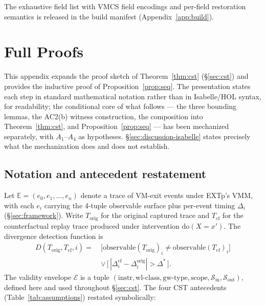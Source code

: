 \documentclass[conference]{IEEEtran}
\newcommand{\Korig}{T_\text{orig}}
\newcommand{\Tcf}{T_\text{cf}}
\newcommand{\Dstar}{\Delta^{*}}
\newcommand{\dox}[1]{\text{do}(X{=}#1)}
\begin{document}
The exhaustive field list with VMCS field encodings and per-field
restoration semantics is released in the build manifest
(Appendix~\ref{app:build}).

\section{Full Proofs}\label{app:proofs}

This appendix expands the proof sketch of
Theorem~\ref{thm:cst} (\S\ref{sec:cst}) and provides the inductive
proof of Proposition~\ref{prop:seq}. The presentation states each step in
standard mathematical notation rather than in Isabelle/HOL syntax,
for readability; the conditional core of what follows --- the three
bounding lemmas, the AC2(b) witness construction, the composition
into Theorem~\ref{thm:cst}, and Proposition~\ref{prop:seq} --- has been
mechanized separately, with $A_1$--$A_4$ as hypotheses.
\S\ref{sec:discussion-isabelle} states precisely what the
mechanization does and does not establish.

\subsection{Notation and antecedent restatement}

Let $\mathbb{E} = (e_0, e_1, \ldots, e_n)$ denote a trace of
VM-exit events under EXTp's VMM, with each $e_i$ carrying the
4-tuple observable surface plus per-event timing $\Delta_i$
(\S\ref{sec:framework}). Write $\Korig$ for the original captured
trace and $\Tcf$ for the counterfactual replay trace produced
under intervention $\dox{x'}$. The divergence detection function
is
\begin{equation*}
\begin{aligned}
D(\Korig, \Tcf, i) =\ & \big[\text{observable}(\Korig)_i \neq \text{observable}(\Tcf)_i\big] \\
                      & \vee\,\big[\,|\Delta_i^{\text{cf}} - \Delta_i^{\text{orig}}| > \Dstar\,\big].
\end{aligned}
\end{equation*}
The validity envelope $\mathcal{E}$ is a tuple
$(\text{instr}, \text{wl-class}, \text{gw-type}, \text{scope},
\mathcal{S}_\text{in}, \mathcal{S}_\text{out})$, defined here and
used throughout \S\ref{sec:cst}. The four CST antecedents
(Table~\ref{tab:assumptions}) restated symbolically:
\end{document}
